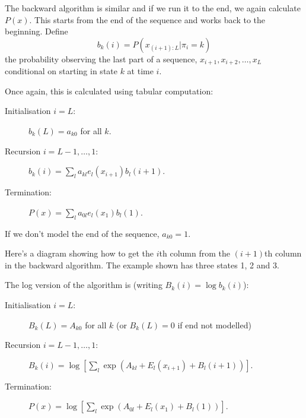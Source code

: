 \documentclass[11pt]{article}
\begin{document}
The backward algorithm is similar and if we run it to the end, we again  calculate $P(x)$.  This starts from the end of the sequence and works back to the beginning.  Define  
\[ b_k(i) = P(x_{(i+1):L} | \pi_i = k)\] 
the probability observing the last part of a sequence, $x_{i+1}, x_{i+2},\ldots,x_L$ conditional on starting in state $k$ at time $i$. 

 

Once again, this is calculated using tabular computation: 
\begin{description}
\item[Initialisation $i = L$:] $b_k(L) = a_{k0}$ for all $k$.
\item[Recursion $i = L-1,\ldots,1$:] $b_k(i) =  \sum_l a_{kl} e_l(x_{i+1}) b_l(i+1)$.
\item[Termination:] $P(x) = \sum_l a_{0l} e_l(x_1) b_l(1)$.
\end{description}
If we don't model the end of the sequence, $a_{k0} = 1$.

Here's a diagram showing how to get the $i$th column from the $(i+1)$th column in the backward algorithm.  The example shown has three states 1, 2 and 3.


The log version of the algorithm is (writing $B_k(i) = \log b_k(i)$):

\begin{description}
\item[Initialisation $i = L$:] $B_k(L) = A_{k0}$ for all $k$ (or $B_k(L) = 0$ if end not modelled)
\item[Recursion $i = L-1,\ldots,1$:] $B_k(i) =  \log \left[ \sum_l \exp(A_{kl} + E_l(x_{i+1}) + B_l(i+1)) \right]$.
\item[Termination:] $P(x) = \log \left[ \sum_l \exp(A_{0l} +  E_l(x_1) + B_l(1)) \right]$.
\end{description}
\end{document}
